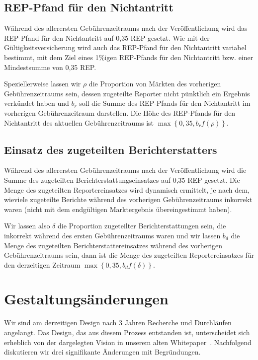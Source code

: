 \documentclass[floatfix,reprint,nofootinbib,amsmath,amssymb,epsfig,pre,floats,letterpaper,groupedaffiliation]{revtex4-1}
\theoremstyle{definition}
\theoremstyle{definition}
\theoremstyle{definition}
\begin{document}
\begin{appendix}
\subsection{REP-Pfand für den Nichtantritt}\label{section:bond_size_adjustment_details_no-show_bonds}

Während des allerersten Gebührenzeitraums nach der Veröffentlichung wird das REP-Pfand für den Nichtantritt auf 0,35 REP gesetzt. Wie mit der Gültigkeitsversicherung wird auch das REP-Pfand für den Nichtantritt variabel bestimmt, mit dem Ziel eines 1\%igen REP-Pfands für den Nichtantritt bzw. einer Mindestsumme von 0,35 REP.

Speziellerweise lassen wir $\rho$ die Proportion von Märkten des vorherigen Gebührenzeitraums sein, dessen zugeteilte Reporter nicht pünktlich ein Ergebnis verkündet haben und $b_r$ soll die Summe des REP-Pfands für den Nichtantritt im vorherigen Gebührenzeitraum darstellen. Die Höhe des REP-Pfands für den Nichtantritt des aktuellen Gebührenzeitraums ist $\max\left\{0,35,b_r f(\rho)\right\}$.

\subsection{Einsatz des zugeteilten Berichterstatters}\label{section:bond_size_adjustment_details_designated_reporter_stake}

Während des allerersten Gebührenzeitraums nach der Veröffentlichung wird die Summe des zugeteilten Berichterstattungseinsatzes auf 0,35 REP gesetzt. Die Menge des zugeteilten Reportereinsatzes wird dynamisch ermittelt, je nach dem, wieviele zugeteilte Berichte während des vorherigen Gebührenzeitraums inkorrekt waren (nicht mit dem endgültigen Marktergebnis übereingestimmt haben).

Wir lassen also $\delta$ die Proportion zugeteilter Berichterstattungen sein, die inkorrekt während des ersten Gebührenzeitraums waren und wir lassen $b_d$ die Menge des zugeteilten Berichterstattereinsatzes während des vorherigen Gebührenzeitraums sein, dann ist die Menge des zugeteilten Reportereinsatzes für den derzeitigen Zeitraum $\max\left\{0,35, b_d f(\delta)\right\}$.

\section{Gestaltungsänderungen}\label{section:design_changes}

Wir sind am derzeitigen Design nach 3 Jahren Recherche und Durchläufen angelangt. Das Design, das aus diesem Prozess entstanden ist, unterscheidet sich erheblich von der dargelegten Vision in unserem alten Whitepaper~\cite{Peterson_2014}. Nachfolgend diskutieren wir drei signifikante Änderungen mit Begründungen.


\end{appendix}
\end{document}
